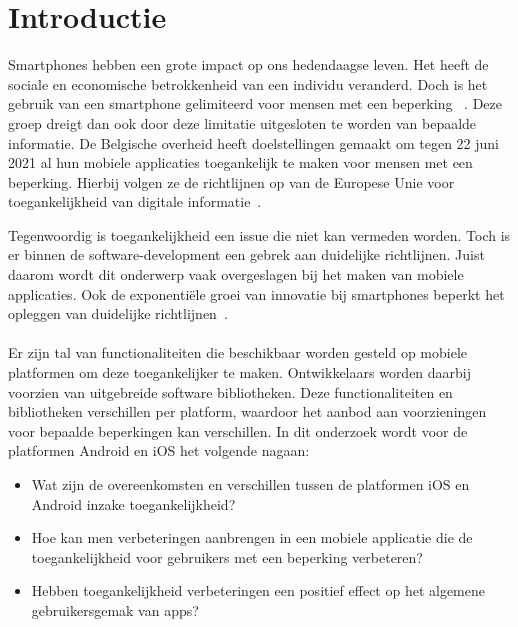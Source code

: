 
\section{Introductie} %
\label{sec:introductie}

Smartphones hebben een grote impact op ons hedendaagse leven. Het heeft de sociale en economische betrokkenheid van een individu veranderd.  Doch is het gebruik van een smartphone gelimiteerd voor mensen met een beperking
~\autocite{morris2014wireless}. Deze groep dreigt dan ook door deze limitatie uitgesloten te worden van bepaalde informatie. De Belgische overheid heeft doelstellingen gemaakt om tegen 22 juni 2021 al hun mobiele applicaties toegankelijk te maken voor mensen met een beperking. Hierbij volgen ze de richtlijnen op van de Europese Unie voor toegankelijkheid van digitale informatie~\autocite{Knacktoegankelijkheid2018}.

Tegenwoordig is toegankelijkheid een issue die niet kan vermeden worden. Toch is er binnen de software-development een gebrek aan duidelijke richtlijnen. Juist daarom wordt dit onderwerp vaak overgeslagen bij het maken van mobiele applicaties. Ook de exponentiële groei van innovatie bij smartphones beperkt het opleggen van duidelijke richtlijnen~\autocite{diaz2014accessibility}. 
\\~\\
Er zijn  tal van functionaliteiten die beschikbaar worden gesteld op mobiele platformen om deze toegankelijker te maken. Ontwikkelaars worden daarbij voorzien van uitgebreide software bibliotheken. Deze functionaliteiten en bibliotheken verschillen per platform, waardoor het aanbod aan voorzieningen voor bepaalde beperkingen kan verschillen. In dit onderzoek wordt voor de platformen Android en iOS het volgende nagaan:




\begin{itemize}
    \setlength\itemsep{0.5 em}
    \item Wat zijn de overeenkomsten en verschillen tussen de platformen iOS en Android inzake toegankelijkheid?
  \item Hoe kan men verbeteringen aanbrengen in een mobiele applicatie die de toegankelijkheid voor gebruikers met een beperking verbeteren?
  \item Hebben toegankelijkheid verbeteringen een positief effect op het algemene gebruikersgemak van apps? 
  
\end{itemize}

